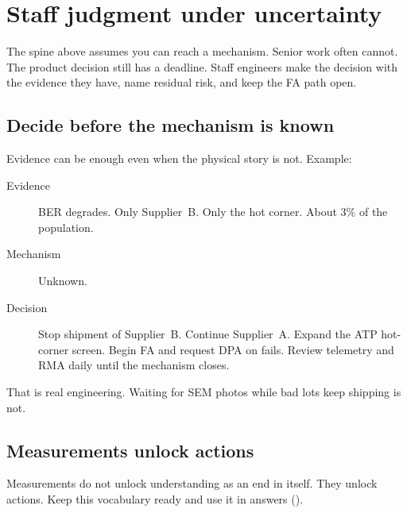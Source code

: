 \section{Staff judgment under uncertainty}
\label{sec:interview-under-uncertainty}

The spine above assumes you can reach a mechanism. Senior work often cannot.
The product decision still has a deadline. Staff engineers make the decision
with the evidence they have, name residual risk, and keep the FA path open.

\subsection{Decide before the mechanism is known}

Evidence can be enough even when the physical story is not. Example:
\begin{description}
\item[Evidence] BER degrades. Only Supplier~B. Only the hot corner. About
      3\% of the population.
\item[Mechanism] Unknown.
\item[Decision] Stop shipment of Supplier~B. Continue Supplier~A. Expand the
      ATP hot-corner screen. Begin FA and request
      DPA on fails. Review telemetry and RMA daily
      until the mechanism closes.
\end{description}
That is real engineering. Waiting for SEM photos while bad lots keep shipping
is not.

\subsection{Measurements unlock actions}

Measurements do not unlock understanding as an end in itself. They unlock
actions. Keep this vocabulary ready and use it in answers
().

